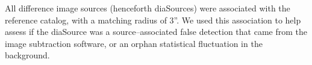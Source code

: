 \documentclass[iop]{emulateapj}
\begin{document}

All difference image sources (henceforth diaSources) were associated with the reference catalog, with a matching radius of 3''.
We used this association to help assess if the diaSource was a source--associated false detection that came from the image subtraction software, or an orphan statistical fluctuation in the background.

%
%
%
%
\end{document}
